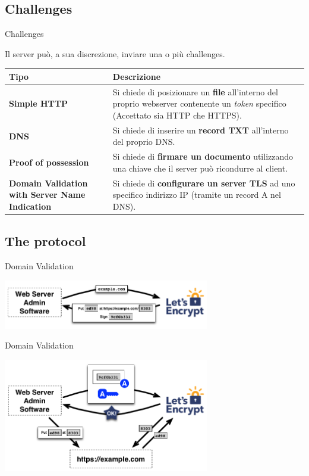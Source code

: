 \documentclass[xcolor=svgnames,11pt]{beamer}
\begin{document}
\subsection{Challenges}
\begin{frame}[fragile]{Challenges}
\begin{center}

Il server può, a sua discrezione, inviare una o più challenges.
\medskip\pause

\begin{tabular}{p{3cm}p{6cm}}

\hline
\textbf{Tipo} & \textbf{Descrizione} \\
\hline
\textcolor{leblue}{\textbf{\small Simple HTTP}} & \textcolor{leblue}{{\small Si chiede di posizionare un \textbf{file} all'interno del
 proprio webserver contenente un \emph{token} specifico (Accettato sia HTTP che HTTPS).}} \\
\hline
\textbf{\small DNS} & {\small Si chiede di inserire un \textbf{record TXT} all'interno del proprio DNS.} \\
\hline\hline
\textbf{\scriptsize Proof of possession} & {\scriptsize Si chiede di \textbf{firmare un documento} utilizzando una chiave
che il server può ricondurre al client.} \\
\hline
\textbf{\scriptsize Domain Validation with Server Name Indication} & {\scriptsize Si chiede di \textbf{configurare un server
TLS} ad uno specifico indirizzo IP (tramite un record A nel DNS).} \\
\hline
\end{tabular}
\end{center}
\end{frame}

\subsection{The protocol}
\begin{frame}{Domain Validation}
\begin{center}
\includegraphics[width=9cm]{img/proto_1.png}
\end{center}
\end{frame}

\begin{frame}{Domain Validation}
\begin{center}
\includegraphics[width=9cm]{img/proto_2.png}
\end{center}
\end{frame}
\end{document}
